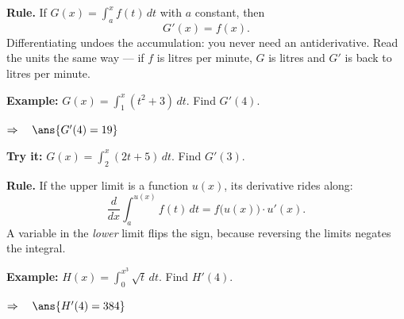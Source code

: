 \documentclass[12pt]{article}
\begin{document}


\begin{formulabox}
\textbf{Rule.} If $\displaystyle G(x) = \int_a^x f(t)\,dt$ with $a$ constant,
then
\[ G'(x) = f(x). \]
Differentiating undoes the accumulation: you never need an antiderivative.
Read the units the same way --- if $f$ is litres per minute, $G$ is litres and
$G'$ is back to litres per minute.
\end{formulabox}

\begin{examplebox}
\textbf{Example:} \quad $\displaystyle G(x) = \int_1^x (t^2 + 3)\,dt$. Find $G'(4)$.

$\Rightarrow\quad \ans{G'(4) = 19}$
\end{examplebox}

\begin{tryitbox}
\textbf{Try it:} \quad $\displaystyle G(x) = \int_2^x (2t + 5)\,dt$. Find $G'(3)$.\\[2pt]
\end{tryitbox}


\begin{formulabox}
\textbf{Rule.} If the upper limit is a function $u(x)$, its derivative rides
along:
\[ \frac{d}{dx}\int_a^{u(x)} f(t)\,dt = f\big(u(x)\big)\cdot u'(x). \]
A variable in the \emph{lower} limit flips the sign, because reversing the
limits negates the integral.
\end{formulabox}

\begin{examplebox}
\textbf{Example:} \quad $\displaystyle H(x) = \int_0^{x^3}\sqrt{t}\,dt$. Find $H'(4)$.

$\Rightarrow\quad \ans{H'(4) = 384}$
\end{examplebox}
\end{document}
